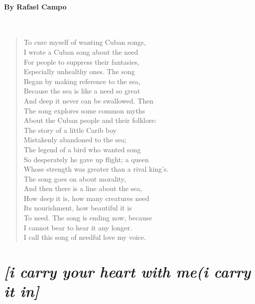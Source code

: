 \documentclass[12pt, openany, letterpaper]{memoir}
\begin{document}
\paragraph{By Rafael Campo}~
\begin{verse}
	To cure myself of wanting Cuban songs,\\
	I wrote a Cuban song about the need\\
	For people to suppress their fantasies,\\
	Especially unhealthy ones. The song\\
	Began by making reference to the sea,\\
	Because the sea is like a need so great\\
	And deep it never can be swallowed. Then\\
	The song explores some common myths\\
	About the Cuban people and their folklore:\\
	The story of a little Carib boy\\
	Mistakenly abandoned to the sea;\\
	The legend of a bird who wanted song\\
	So desperately he gave up flight; a queen\\
	Whose strength was greater than a rival king’s.\\
	The song goes on about morality,\\
	And then there is a line about the sea,\\
	How deep it is, how many creatures need\\
	Its nourishment, how beautiful it is\\
	To need. The song is ending now, because\\
	I cannot bear to hear it any longer.\\
	I call this song of needful love my voice.
\end{verse}

\newpage
\section*{\emph{[i carry your heart with me(i carry it in]}}
\end{document}
